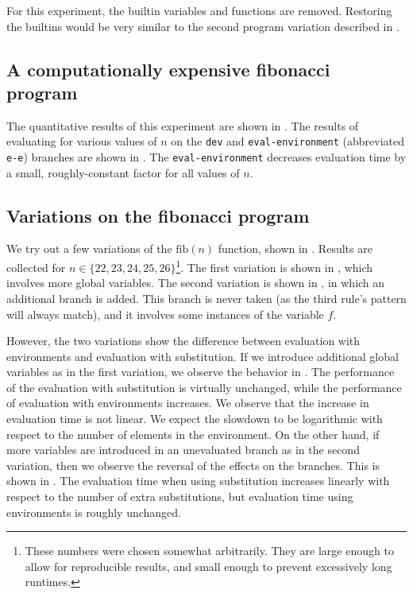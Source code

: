 For this experiment, the builtin variables and functions are removed. Restoring the builtins would be very similar to the second program variation described in .

\subsection{A computationally expensive fibonacci program}
\label{sec:eval-fib}

The quantitative results of this experiment are shown in . The results of evaluating  for various values of $n$ on the \texttt{dev} and \texttt{eval-environment} (abbreviated \texttt{e-e}) branches are shown in . The \texttt{eval-environment} decreases evaluation time by a small, roughly-constant factor for all values of $n$.

\subsection{Variations on the fibonacci program}
\label{sec:eval-fib-variations}

We try out a few variations of the $\text{fib}(n)$ function, shown in . Results are collected for $n\in\{22,23,24,25,26\}$\footnote{These numbers were chosen somewhat arbitrarily. They are large enough to allow for reproducible results, and small enough to prevent excessively long runtimes.}. The first variation is shown in , which involves more global variables. The second variation is shown in , in which an additional branch is added. This branch is never taken (as the third rule's pattern will always match), and it involves some instances of the variable $f$.

However, the two variations show the difference between evaluation with environments and evaluation with substitution. If we introduce additional global variables as in the first variation, we observe the behavior in . The performance of the evaluation with substitution is virtually unchanged, while the performance of evaluation with environments increases. We observe that the increase in evaluation time is not linear. We expect the slowdown to be logarithmic with respect to the number of elements in the environment. On the other hand, if more variables are introduced in an unevaluated branch as in the second variation, then we observe the reversal of the effects on the branches. This is shown in . The evaluation time when using substitution increases linearly with respect to the number of extra substitutions, but evaluation time using environments is roughly unchanged.

